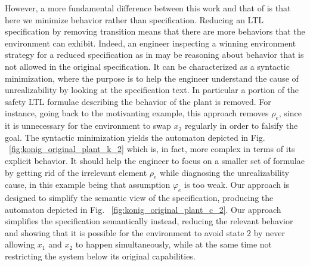 However, a more fundamental difference between this work and that of \cite{DBLP:conf/fmcad/KonighoferHB09} is that here we minimize behavior rather than specification. Reducing an LTL specification by removing transition means that there are more behaviors that the environment can exhibit. Indeed, an engineer inspecting a winning environment strategy for a reduced specification as in \cite{DBLP:conf/fmcad/KonighoferHB09} may be reasoning about behavior that is not allowed in the original specification.  It can be characterized as a syntactic minimization, where the purpose is to help the engineer understand the cause of unrealizability by looking at the specification text. In particular a portion of the safety LTL formulae describing the behavior of the plant is removed. For instance, going back to the motivanting example, this approach removes $\rho_e$, since it is unnecessary for the environment to swap $x_2$ regularly in order to falsify the goal.  The syntactic minimization yields the automaton depicted in Fig. ~\ref{fig:konig_original_plant_k_2} which is, in fact, more complex in terms of its explicit behavior. 
It should help the engineer to focus on a smaller set of formulae by getting rid of the irrelevant element $\rho_e$ while diagnosing the unrealizability cause, in this example being that assumption $\varphi_e$ is too weak. 
Our approach is designed to simplify the semantic view of the specification, producing the automaton depicted in Fig. ~\ref{fig:konig_original_plant_c_2}.
Our approach simplifies the specification semantically instead, reducing the relevant behavior and showing that it is possible for the environment to avoid state 2 by never allowing $x_1$ and $x_2$ to happen simultaneously, while at the same time not restricting the system below its original capabilities.
